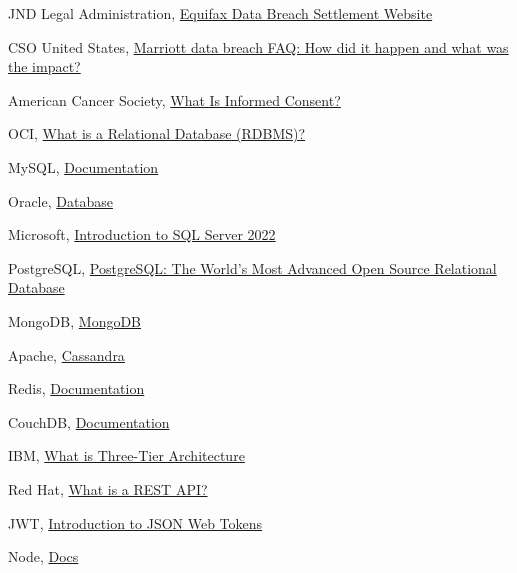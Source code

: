 \documentclass[target=mst,aauheader=]{thud}
\begin{document}
\begin{thebibliography}{99}
    JND Legal Administration, \href{https://www.equifaxbreachsettlement.com/}{Equifax Data Breach Settlement Website}

    CSO United States, \href{https://www.csoonline.com/article/3441220/marriott-data-breach-faq-how-did-it-happen-and-what-was-the-impact.html}{Marriott data breach FAQ: How did it happen and what was the impact?}
    
    American Cancer Society, \href{https://www.cancer.org/treatment/treatments-and-side-effects/planning-managing/informed-consent/what-is-informed-consent.html}{What Is Informed Consent?}
    

    OCI, \href{https://www.oracle.com/database/what-is-a-relational-database/}{What is a Relational Database (RDBMS)?}

    MySQL, \href{https://dev.mysql.com/doc/}{Documentation}

    Oracle, \href{https://www.oracle.com/database/}{Database}

    Microsoft, \href{https://www.microsoft.com/it-it/sql-server}{Introduction to SQL Server 2022}

    PostgreSQL, \href{https://www.postgresql.org/}{PostgreSQL: The World's Most Advanced Open Source Relational Database}

    MongoDB, \href{https://www.mongodb.com/}{MongoDB}

    Apache, \href{https://cassandra.apache.org/_/index.html}{Cassandra}

    Redis, \href{https://redis.io/docs/}{Documentation}

    CouchDB, \href{https://docs.couchdb.org/en/stable/}{Documentation}

    IBM, \href{https://www.ibm.com/topics/three-tier-architecture}{What is Three-Tier Architecture}

    Red Hat, \href{https://www.redhat.com/en/topics/api/what-is-a-rest-api}{What is a REST API?}

    JWT, \href{https://jwt.io/introduction}{Introduction to JSON Web Tokens}

    Node, \href{https://nodejs.org/en/docs/}{Docs}


\end{thebibliography}
\end{document}
